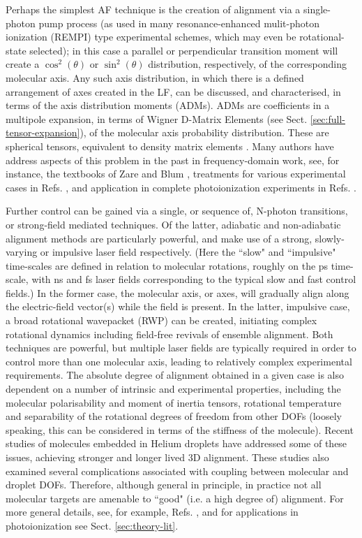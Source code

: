 Perhaps the simplest AF technique is the creation of alignment via a single-photon pump process (as used in many resonance-enhanced mulit-photon ionization (REMPI) type experimental schemes, which may even be rotational-state selected); in this case a parallel or perpendicular transition moment will create a $\cos^2(\theta)$ or $\sin^2(\theta)$ distribution, respectively, of the corresponding molecular axis. Any such axis distribution, in which there is a defined arrangement of axes created in the LF, can be discussed, and characterised, in terms of the axis distribution moments (ADMs). ADMs are coefficients in a multipole expansion, in terms of Wigner D-Matrix Elements (see Sect. \ref{sec:full-tensor-expansion}), of the molecular axis probability distribution. These are spherical tensors, equivalent to density matrix elements \cite{BlumDensityMat}. Many authors have address aspects of this problem in the past in frequency-domain work, see, for instance, the textbooks of Zare \cite{zareAngMom} and Blum \cite{BlumDensityMat}, treatments for various experimental cases in Refs. \cite{Docker1988,Dubs1989,Greene1983}, and application in complete photoionization experiments in Refs. \cite{Leahy1991,hockett2009RotationallyResolvedPhotoelectron}.

Further control can be gained via a single, or sequence of, N-photon transitions, or strong-field mediated techniques. Of the latter, adiabatic and non-adiabatic alignment methods are particularly powerful, and make use of a strong, slowly-varying or impulsive laser field respectively. (Here the ``slow" and ``impulsive" time-scales are defined in relation to molecular rotations, roughly on the ps time-scale, with ns and fs laser fields corresponding to the typical slow and fast control fields.) In the former case, the molecular axis, or axes, will gradually align along the electric-field vector(s) while the field is present. In the latter, impulsive case, a broad rotational wavepacket (RWP) can be created, initiating complex rotational dynamics including field-free revivals of ensemble alignment. Both techniques are powerful, but multiple laser fields are typically required in order to control more than one molecular axis, leading to relatively complex experimental requirements. The absolute degree of alignment obtained in a given case is also dependent on a number of intrinsic and experimental properties, including the molecular polarisability 
and moment of inertia tensors, rotational temperature and separability of the rotational degrees of freedom from other DOFs (loosely speaking, this can be considered in terms of the stiffness of the molecule). Recent studies of molecules embedded in Helium droplets have addressed some of these issues, achieving stronger and longer lived 3D alignment. These studies also examined several complications associated with coupling between molecular and droplet DOFs.   Therefore, although general in principle, in practice not all molecular targets are amenable to ``good" (i.e. a high degree of) alignment. For more general details, see, for example, Refs. \cite{koch2019QuantumControlMolecular,Stapelfeldt2003,nielsen2022Helium}, and for applications in photoionization see Sect. \ref{sec:theory-lit}.

